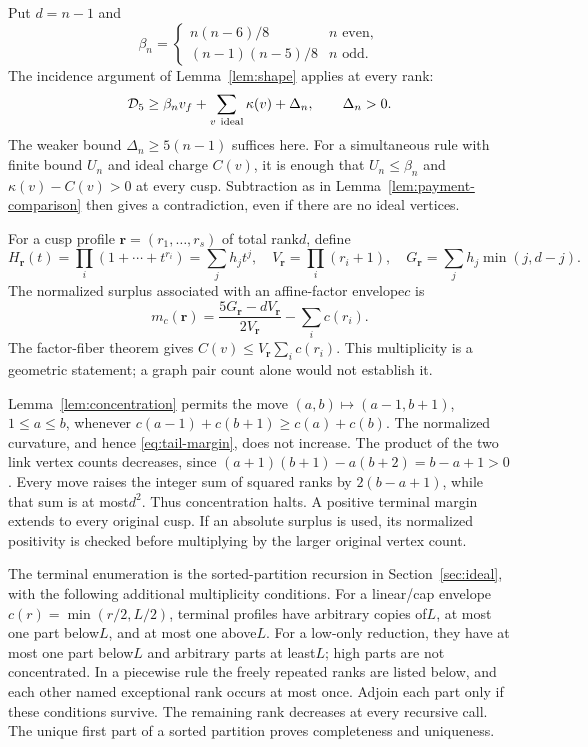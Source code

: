 \documentclass[11pt]{article}
\theoremstyle{remark}\newtheorem{remark}[theorem]{Remark}
\newcommand{\Dfive}{\mathcal D_5}
\begin{document}
Put $d=n-1$ and
\[
 \beta_n=\begin{cases}n(n-6)/8&n\text{ even},\\
 (n-1)(n-5)/8&n\text{ odd}.\end{cases}
\]
The incidence argument of Lemma~\ref{lem:shape} applies at every rank:
\[
 \Dfive\ge\beta_n v_f+\sum_{v\ {\rm ideal}}\kappa(v)+\Delta_n,
 \qquad \Delta_n>0.
\]
The weaker bound $\Delta_n\ge5(n-1)$ suffices here. For a simultaneous
rule with finite bound $U_n$ and ideal charge $C(v)$, it is enough that
$U_n\le\beta_n$ and $\kappa(v)-C(v)>0$ at every cusp. Subtraction as
in Lemma~\ref{lem:payment-comparison} then gives a contradiction, even
if there are no ideal vertices.

For a cusp profile $\boldsymbol r=(r_1,\ldots,r_s)$ of total rank$d$,
define
\[
 H_{\boldsymbol r}(t)=\prod_i(1+\cdots+t^{r_i})=\sum_jh_jt^j,\quad
 V_{\boldsymbol r}=\prod_i(r_i+1),\quad
 G_{\boldsymbol r}=\sum_jh_j\min(j,d-j).
\]
The normalized surplus associated with an affine-factor envelope$c$ is
\begin{equation}\label{eq:tail-margin}
 m_c(\boldsymbol r)=
 \frac{5G_{\boldsymbol r}-dV_{\boldsymbol r}}{2V_{\boldsymbol r}}
       -\sum_i c(r_i).
\end{equation}
The factor-fiber theorem gives
$C(v)\le V_{\boldsymbol r}\sum_i c(r_i)$. This multiplicity is a
geometric statement; a graph pair count alone would not establish it.

Lemma~\ref{lem:concentration} permits the move
$(a,b)\mapsto(a-1,b+1)$, $1\le a\le b$, whenever
$c(a-1)+c(b+1)\ge c(a)+c(b)$. The normalized curvature, and hence
\eqref{eq:tail-margin}, does not increase. The product of the two
link vertex counts decreases, since
$(a+1)(b+1)-a(b+2)=b-a+1>0$.
Every move raises the integer sum of squared ranks by
$2(b-a+1)$, while that sum is at most$d^2$. Thus concentration halts.
A positive terminal margin extends to every original cusp. If an
absolute surplus is used, its normalized positivity is checked before
multiplying by the larger original vertex count.

The terminal enumeration is the sorted-partition recursion in
Section~\ref{sec:ideal}, with the following additional multiplicity
conditions. For a linear/cap envelope $c(r)=\min(r/2,L/2)$, terminal
profiles have arbitrary copies of$L$, at most one part below$L$, and
at most one above$L$. For a low-only reduction, they have at most
one part below$L$ and arbitrary parts at least$L$; high parts are
not concentrated. In a piecewise rule the freely repeated ranks
are listed below, and each other named exceptional rank occurs at
most once. Adjoin each part only if these conditions survive.
The remaining rank decreases at every recursive call. The unique
first part of a sorted partition proves completeness and uniqueness.
\end{document}
